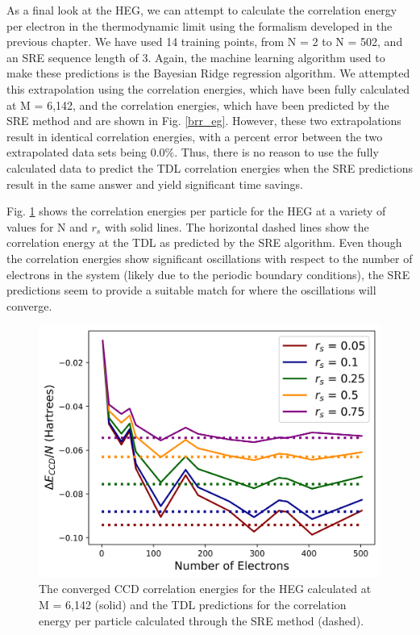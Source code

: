As a final look at the HEG, we can attempt to calculate the correlation energy per electron in the thermodynamic limit using the formalism developed in the previous chapter. We have used 14 training points, from N = 2 to N = 502, and an SRE sequence length of 3. Again, the machine learning algorithm used to make these predictions is the Bayesian Ridge regression algorithm. We attempted this extrapolation using the correlation energies, which have been fully calculated at M = 6,142, and the correlation energies, which have been predicted by the SRE method and are shown in Fig. \ref{brr_eg}.  However, these two extrapolations result in identical correlation energies, with a percent error between the two extrapolated data sets being 0.0$\%$. Thus, there is no reason to use the fully calculated data to predict the TDL correlation energies when the SRE predictions result in the same answer and yield significant time savings.

Fig. \ref{fig:TDL_all} shows the correlation energies per particle for the HEG at a variety of values for N and $r_s$ with solid lines. The horizontal dashed lines show the correlation energy at the TDL as predicted by the SRE algorithm. Even though the correlation energies show significant oscillations with respect to the number of electrons in the system (likely due to the periodic boundary conditions), the SRE predictions seem to provide a suitable match for where the oscillations will converge.

\begin{figure}
    \centering
    \includegraphics[scale=0.75]{Images/Chapter7/ElectronGas/TDL_all.png}
    \caption{The converged CCD correlation energies for the HEG calculated at M = 6,142 (solid) and the TDL predictions for the correlation energy per particle calculated through the SRE method (dashed).}
    \label{fig:TDL_all}
\end{figure}

